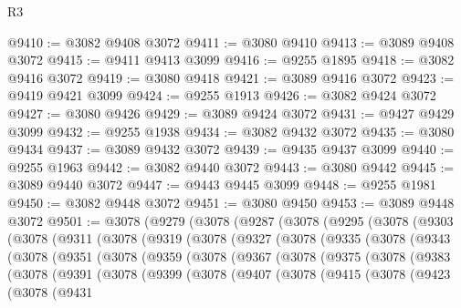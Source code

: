 \begin{lexlean}{R3}
\begin{coremodule}
@9410 := @3082 @9408 @3072
@9411 := @3080 @9410
@9413 := @3089 @9408 @3072
@9415 := @9411 @9413 @3099
@9416 := @9255 @1895
@9418 := @3082 @9416 @3072
@9419 := @3080 @9418
@9421 := @3089 @9416 @3072
@9423 := @9419 @9421 @3099
@9424 := @9255 @1913
@9426 := @3082 @9424 @3072
@9427 := @3080 @9426
@9429 := @3089 @9424 @3072
@9431 := @9427 @9429 @3099
@9432 := @9255 @1938
@9434 := @3082 @9432 @3072
@9435 := @3080 @9434
@9437 := @3089 @9432 @3072
@9439 := @9435 @9437 @3099
@9440 := @9255 @1963
@9442 := @3082 @9440 @3072
@9443 := @3080 @9442
@9445 := @3089 @9440 @3072
@9447 := @9443 @9445 @3099
@9448 := @9255 @1981
@9450 := @3082 @9448 @3072
@9451 := @3080 @9450
@9453 := @3089 @9448 @3072
@9501 := @3078
    (@9279
      (@3078
        (@9287
          (@3078
            (@9295
              (@3078
                (@9303
                  (@3078
                    (@9311
                      (@3078
                        (@9319
                          (@3078
                            (@9327
                              (@3078
                                (@9335
                                  (@3078
                                    (@9343
                                      (@3078
                                        (@9351
                                          (@3078
                                            (@9359
                                              (@3078
                                                (@9367
                                                  (@3078
                                                    (@9375
                                                      (@3078
                                                        (@9383
                                                          (@3078
                                                            (@9391
                                                              (@3078
                                                                (@9399
                                                                  (@3078
                                                                    (@9407
                                                                      (@3078
                                                                        (@9415
                                                                          (@3078
                                                                            (@9423
                                                                              (@3078
                                                                                (@9431

\end{coremodule}
\end{lexlean}
